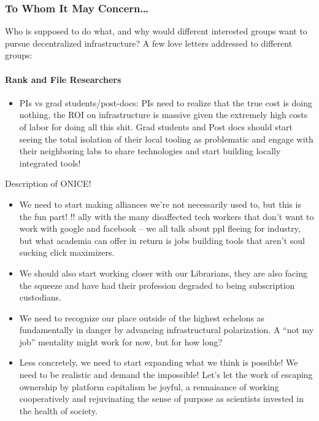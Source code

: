 \documentclass[10pt]{article}
\begin{document}
\begin{multicols}{2}
\hypertarget{to-whom-it-may-concern}{%
\subsubsection{To Whom It May
Concern\ldots{}}\label{to-whom-it-may-concern}}

Who is supposed to do what, and why would different interested groups
want to pursue decentralized infrastructure? A few love letters
addressed to different groups:

\hypertarget{rank-and-file-researchers}{%
\paragraph{Rank and File Researchers}\label{rank-and-file-researchers}}

\begin{itemize}

\item
  PIs vs grad students/post-docs: PIs need to realize that the true cost
  is doing nothing, the ROI on infrastructure is massive given the
  extremely high costs of labor for doing all this shit. Grad students
  and Post docs should start seeing the total isolation of their local
  tooling as problematic and engage with their neighboring labs to share
  technologies and start building locally integrated tools!
\end{itemize}

Description of ONICE!

\begin{itemize}

\item
  We need to start making alliances we're not necessarily used to, but
  this is the fun part! !! ally with the many disaffected tech workers
  that don't want to work with google and facebook -- we all talk about
  ppl fleeing for industry, but what academia can offer in return is
  jobs building tools that aren't soul sucking click maximizers.
\item
  We should also start working closer with our Librarians, they are also
  facing the squeeze and have had their profession degraded to being
  subscription custodians.
\item
  We need to recognize our place outside of the highest echelons as
  fundamentally in danger by advancing infrastructural polarization. A
  ``not my job'' mentality might work for now, but for how long?
\item
  Less concretely, we need to start expanding what we think is possible!
  We need to be realistic and demand the impossible! Let's let the work
  of escaping ownership by platform capitalism be joyful, a rennaisance
  of working cooperatively and rejuvinating the sense of purpose as
  scientists invested in the health of society.
\end{itemize}


\end{multicols}
\end{document}
